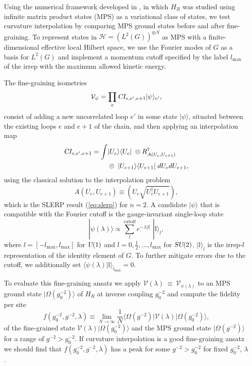 \documentclass[twocolumn,lengthcheck,superscriptaddress]{revtex4-1}
\def\su2{\textsl{SU}(2)}
\def\uone{\textsl{U}(1)}
\theoremstyle{definition}
\theoremstyle{remark}
\begin{document}
Using the numerical framework developed in \cite{milsted:2015a}, in which $H_R$ was studied using infinite matrix product states (MPS) as a variational class of states, we test curvature interpolation by comparing MPS ground states before and after fine-graining. 
To represent states in $\mathcal{H} = (L^2(G))^{\otimes N}$ as MPS with a finite-dimensional effective local Hilbert space, we use the Fourier modes of $G$ as a basis for $L^2(G)$ and implement a momentum cutoff specified by the label $l_{\max}$ of the irrep with the maximum allowed kinetic energy. 

The fine-graining isometries 
\begin{equation} \label{eq:interp_R}
  \mathcal{V}_\psi = \prod_{e} \textsl{C}I_{e,e',e + 1} |\psi\rangle_{e'},
\end{equation}
consist of adding a new uncorrelated loop $e'$ in some state $|\psi\rangle$, situated between the existing loops $e$ and $e+1$ of the chain, 
and then applying an interpolation map 
\begin{align}
  \textsl{C}I_{e,e',e + 1} = \int &|U_e\rangle \langle U_e | \;  \otimes R^\dagger_{A(U_e, U_{e+1})} \\
                        &\otimes \; |U_{e+1}\rangle \langle U_{e+1}| \; dU_e dU_{e+1}, \nonumber
\end{align}
using the classical solution to the interpolation problem 
\begin{equation}
  A(U_e, U_{e+1}) \equiv  \left(U_e \sqrt{U_e^\dagger U_{e+1}} \right),
\end{equation}
which is the SLERP result (\ref{eq:slerp}) for $n=2$.
A candidate $|\psi\rangle$ that is compatible with the Fourier cutoff is the gauge-invariant single-loop state
\begin{equation}
  |\psi(\lambda)\rangle \propto \sum_{l}^{\text{cutoff}} e^{-\lambda |l|}\; |\mathbb{I}\rangle_l,
\end{equation}
where $l = [-l_{\max}, l_{\max}]$ for $\uone$ and $l = 0, \frac{1}{2},\dots, l_{\max}$ for $\su2$. $|\mathbb{I}\rangle_l$ is the irrep-$l$ representation of the identity element of $G$. To further mitigate errors due to the cutoff, we additionally set $\langle \psi(\lambda) | \mathbb{I}\rangle_{l_{\max}} = 0$.

To evaluate this fine-graining ansatz we apply $\mathcal{V}(\lambda)~\equiv~\mathcal{V}_{\psi(\lambda)}$ to an MPS ground state $|\Omega(g_0^{-2})\rangle$ of $H_R$ at inverse coupling $g_0^{-2}$ and compute the fidelity per site
\begin{equation}
  f(g_0^{-2}, g^{-2}, \lambda) \equiv \lim_{N \rightarrow \infty} \frac{1}{N} \langle\Omega(g^{-2})|\mathcal{V}(\lambda)|\Omega(g_0^{-2})\rangle,
\end{equation}
of the fine-grained state $\mathcal{V}(\lambda)|\Omega(g_0^{-2})\rangle$ and the MPS ground state $|\Omega(g^{-2})\rangle$ for a range of $g^{-2} > g_0^{-2}$. If curvature interpolation is a good fine-graining ansatz we should find that $f(g_0^{-2}, g^{-2}, \lambda)$ has a peak for some $g^{-2} > g_0^{-2}$ for fixed $g_0^{-2}$, $\lambda$. 
\end{document}

